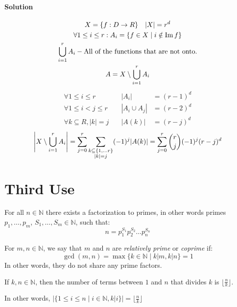 \documentclass[00_complete]{subfiles}
\begin{document}
\paragraph{Solution}
$$
\begin{gathered}
    X=\{f:D\to R\} \quad |X|=r^d\\
    \forall 1\leq i \leq r: A_i = \{f \in X \mid i \notin \operatorname{Im} f\} \\
    \bigcup_{i=1}^rA_i - \text{All of the functions that are not onto.} \\
    A = X \setminus \bigcup_{i=1}^rA_i\\
\end{gathered}
$$
$$\begin{aligned}
    \forall 1 \leq i \leq r \quad &|A_i|&=(r-1)^d \\
    \forall 1 \leq i<j \leq r \quad &|A_i\cup A_j|&=(r-2)^d \\
    \forall k \subseteq R, |k|=j \quad &|A(k)|&=(r-j)^d
\end{aligned}$$
$$
\begin{gathered}
    \left|X \setminus \bigcup_{i=1}^rA_i\right| =
    \sum_{j=0}^{r}\sum_{\begin{subarray}{c}k \subseteq \{1,\dots
    r\}\\|k|=j\end{subarray}}(-1)^j|A(k)| =
    \sum_{j=0}^{r}\binom{r}{j}(-1)^j(r-j)^d
\end{gathered}
$$

\section{Third Use}

\begin{claim}
    For all $n \in \mathbb{N}$ there exists a factorization to primes, in
    other words primes $p_1,\dots,p_m$, $S_1,\dots,S_m\in \mathbb{N}$, such
    that:
    $$n=p_1^{S_1}p_2^{S_2}\dots p_n^{S_n}$$
\end{claim}

\begin{definition}
    For $m,n \in \mathbb{N}$, we say that $m$ and $n$ are \emph{relatively
    prime} or \emph{coprime} if:
    $$\gcd(m,n)=\max\{k \in \mathbb{N}\mid k|m, k|n\} = 1$$
    In other words, they do not share any prime factors.
\end{definition}

\begin{claim}
   If $k,n \in \mathbb{N}$, then the number of terms between $1$ and $n$ that
   divides $k$ is $\lfloor\frac{n}{k}\rfloor$.

   In other words, $|\{1 \leq i \leq n \mid i \in \mathbb{N},
   k|i\}|=\lfloor\frac{n}{k}\rfloor$
\end{claim}
\end{document}
